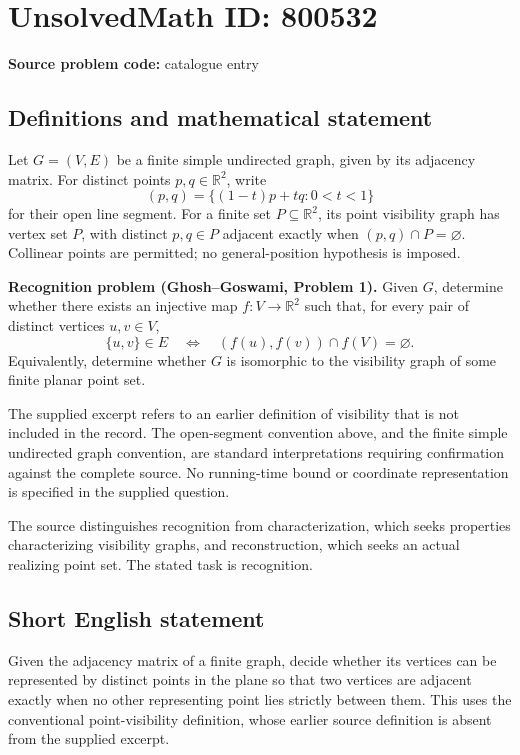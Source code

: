 \documentclass[11pt]{article}
\newcommand{\R}{\mathbb{R}}
\begin{document}
\section*{UnsolvedMath ID: 800532}
\textbf{Source problem code:} catalogue entry
\subsection{Definitions and mathematical statement}
Let \(G=(V,E)\) be a finite simple undirected graph, given by its adjacency matrix. For distinct points \(p,q\in\R^2\), write
\[
(p,q)=\{(1-t)p+tq:0<t<1\}
\]
for their open line segment. For a finite set \(P\subseteq\R^2\), its point visibility graph has vertex set \(P\), with distinct \(p,q\in P\) adjacent exactly when \((p,q)\cap P=\varnothing\). Collinear points are permitted; no general-position hypothesis is imposed.

\textbf{Recognition problem (Ghosh--Goswami, Problem 1).} Given \(G\), determine whether there exists an injective map \(f:V\to\R^2\) such that, for every pair of distinct vertices \(u,v\in V\),
\[
\{u,v\}\in E
\quad\Longleftrightarrow\quad
(f(u),f(v))\cap f(V)=\varnothing.
\]
Equivalently, determine whether \(G\) is isomorphic to the visibility graph of some finite planar point set.

The supplied excerpt refers to an earlier definition of visibility that is not included in the record. The open-segment convention above, and the finite simple undirected graph convention, are standard interpretations requiring confirmation against the complete source. No running-time bound or coordinate representation is specified in the supplied question.

The source distinguishes recognition from characterization, which seeks properties characterizing visibility graphs, and reconstruction, which seeks an actual realizing point set. The stated task is recognition.
\subsection{Short English statement}
Given the adjacency matrix of a finite graph, decide whether its vertices can be represented by distinct points in the plane so that two vertices are adjacent exactly when no other representing point lies strictly between them. This uses the conventional point-visibility definition, whose earlier source definition is absent from the supplied excerpt.
\end{document}

